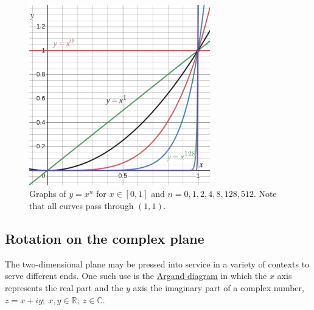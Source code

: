 \documentclass[
  a4paper,
]{article}
\begin{document}
\begin{figure}
\hypertarget{fig:x-to-n}{%
\centering
\includegraphics[width=0.7\textwidth,height=\textheight]{images/y-equals-x-to-the-n-in-0-1.png}
\caption{Graphs of \(y = x^n\) for \(x \in [0, 1]\) and
\(n = 0, 1, 2, 4, 8, 128, 512\). Note that all curves pass through
\((1, 1)\).}\label{fig:x-to-n}
}
\end{figure}

\hypertarget{rotation-on-the-complex-plane}{%
\subsection{Rotation on the complex
plane}\label{rotation-on-the-complex-plane}}

The two-dimensional plane may be pressed into service in a variety of
contexts to serve different ends. One such use is the
\href{https://mathworld.wolfram.com/ArgandDiagram.html}{Argand diagram}
in which the \(x\) axis represents the real part and the \(y\) axis the
imaginary part of a complex number,
\(z = x + iy;\:x, y \in \mathbb{R};\: z \in \mathbb{C}\).
\end{document}
